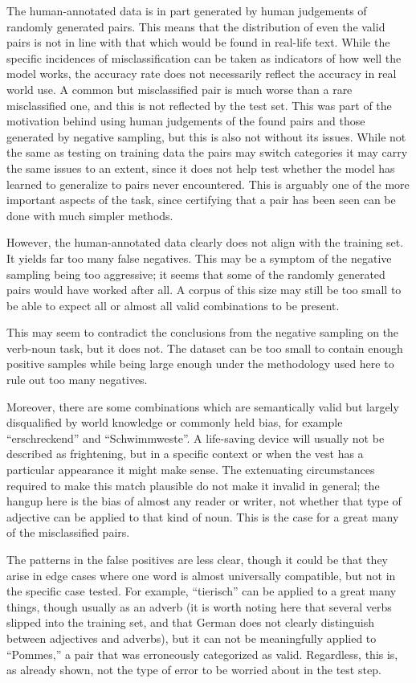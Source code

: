 \documentclass[a4paper, 12pt]{article}
\begin{document}
The human-annotated data is in part generated by human judgements of randomly generated pairs. This means that the distribution of even the valid pairs is not in line with that which would be found in real-life text. While the specific incidences of misclassification can be taken as indicators of how well the model works, the accuracy rate does not necessarily reflect the accuracy in real world use. A common but misclassified pair is much worse than a rare misclassified one, and this is not reflected by the test set. This was part of the motivation behind using human judgements of the found pairs and those generated by negative sampling, but this is also not without its issues. While not the same as testing on training data \textemdash the pairs may switch categories \textemdash it may carry the same issues to an extent, since it does not help test whether the model has learned to generalize to pairs never encountered. This is arguably one of the more important aspects of the task, since certifying that a pair has been seen can be done with much simpler methods.

However, the human-annotated data clearly does not align with the training set. It yields far too many false negatives. This may be a symptom of the negative sampling being too aggressive; it seems that some of the randomly generated pairs would have worked after all. A corpus of this size may still be too small to be able to expect all or almost all valid combinations to be present.

This may seem to contradict the conclusions from the negative sampling on the verb-noun task, but it does not. The dataset can be too small to contain enough positive samples while being large enough \textemdash under the methodology used here \textemdash to rule out too many negatives.

Moreover, there are some combinations which are semantically valid but largely disqualified by world knowledge or commonly held bias, for example ``erschreckend'' and ``Schwimmweste''. A life-saving device will usually not be described as frightening, but in a specific context or when the vest has a particular appearance it might make sense. The extenuating circumstances required to make this match plausible do not make it invalid in general; the hangup here is the bias of almost any reader or writer, not whether that type of adjective can be applied to that kind of noun. This is the case for a great many of the misclassified pairs.

The patterns in the false positives are less clear, though it could be that they arise in edge cases where one word is almost universally compatible, but not in the specific case tested. For example, ``tierisch'' can be applied to a great many things, though usually as an adverb (it is worth noting here that several verbs slipped into the training set, and that German does not clearly distinguish between adjectives and adverbs), but it can not be meaningfully applied to ``Pommes,'' a pair that was erroneously categorized as valid. Regardless, this is, as already shown, not the type of error to be worried about in the test step.
\end{document}
